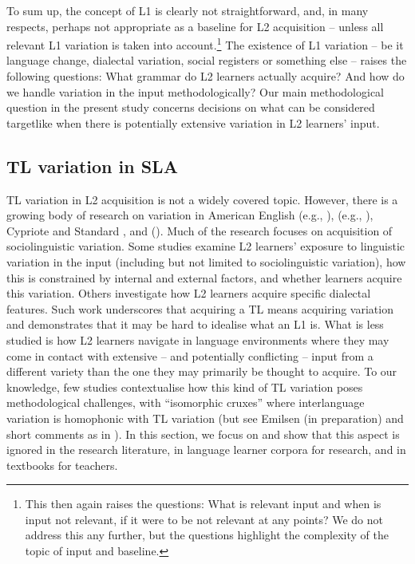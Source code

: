 \documentclass[output=paper,colorlinks,citecolor=brown,modfonts,nonflat]{../langscibook}
\begin{document}
To sum up, the concept of L1 is clearly not straightforward, and, in many respects, perhaps not appropriate as a baseline for L2 acquisition – unless all relevant L1 variation is taken into account.{\footnote{This then again raises the questions: What is relevant input and when is input not relevant, if it were to be not relevant at any points? We do not address this any further, but the questions highlight the complexity of the topic of input and baseline.}} The existence of L1 variation – be it language change, dialectal variation, social registers or something else – raises the following questions: What grammar do L2 learners actually acquire? And how do we handle variation in the input methodologically? Our main methodological question in the present study concerns decisions on what can be considered targetlike when there is potentially extensive variation in L2 learners’ input.

\subsection{TL variation in SLA}\label{sec:emilsen:2.3}

TL variation in L2 acquisition is not a widely covered topic. However, there is a growing body of research on variation in American English (e.g., \citealt{Eisenstein1986}),  (e.g., \citealt{Gudmestad2012}), Cypriote and Standard  \citep{LeivadaEtAl2017}, and  (\citealt{RodinaWestergaard2015Bilingualism}). Much of the research focuses on acquisition of sociolinguistic variation. Some studies examine L2 learners’ exposure to linguistic variation in the input (including but not limited to sociolinguistic variation), how this is constrained by internal and external factors, and whether learners acquire this variation. Others investigate how L2 learners acquire specific dialectal features. Such work underscores that acquiring a TL means acquiring variation and demonstrates that it may be hard to idealise what an L1 is. What is less studied is how L2 learners navigate in language environments where they may come in contact with extensive – and potentially conflicting – input from a different variety than the one they may primarily be thought to acquire. To our knowledge, few studies contextualise how this kind of TL variation poses methodological challenges, with ``isomorphic cruxes'' where interlanguage variation is homophonic with TL variation (but see Emilsen (in preparation) and short comments as in \citealt[17]{Cornips2018}). In this section, we focus on  and show that this aspect is ignored in the research literature, in language learner corpora for research, and in textbooks for teachers.
\end{document}
